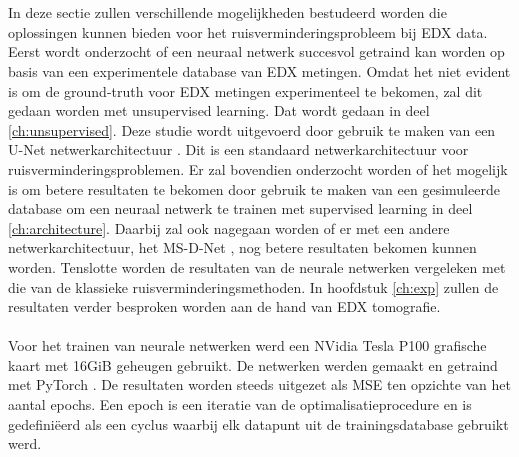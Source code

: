 \documentclass{report}
\begin{document}
\\ \\
In deze sectie zullen verschillende mogelijkheden bestudeerd worden die oplossingen kunnen bieden voor het ruisverminderingsprobleem bij EDX data. Eerst wordt onderzocht of een neuraal netwerk succesvol getraind kan worden op basis van een experimentele database van EDX metingen. Omdat het niet evident is om de ground-truth voor EDX metingen experimenteel te bekomen, zal dit gedaan worden met unsupervised learning. Dat wordt gedaan in deel \ref{ch:unsupervised}. Deze studie wordt uitgevoerd door gebruik te maken van een U-Net netwerkarchitectuur \cite{paper:unet}. Dit is een standaard netwerkarchitectuur voor ruisverminderingsproblemen. Er zal bovendien onderzocht worden of het mogelijk is om betere resultaten te bekomen door gebruik te maken van een gesimuleerde database om een neuraal netwerk te trainen met supervised learning in deel \ref{ch:architecture}. Daarbij zal ook nagegaan worden of er met een andere netwerkarchitectuur, het MS-D-Net \cite{paper:msdnet}, nog betere resultaten bekomen kunnen worden. Tenslotte worden de resultaten van de neurale netwerken vergeleken met die van de klassieke ruisverminderingsmethoden. In hoofdstuk \ref{ch:exp} zullen de resultaten verder besproken worden aan de hand van EDX tomografie.
\\ \\
Voor het trainen van neurale netwerken werd een NVidia Tesla P100 grafische kaart met 16GiB geheugen gebruikt. De netwerken werden gemaakt en getraind met PyTorch \cite{software:pytorch}. De resultaten worden steeds uitgezet als MSE ten opzichte van het aantal epochs. Een epoch is een iteratie van de optimalisatieprocedure en is gedefiniëerd als een cyclus waarbij elk datapunt uit de trainingsdatabase gebruikt werd.
\end{document}
